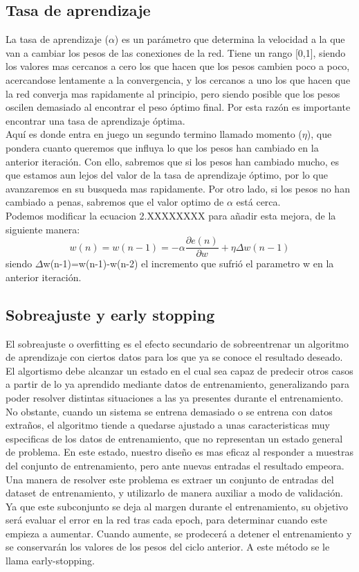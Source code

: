 \subsection{Tasa de aprendizaje}
La tasa de aprendizaje (${\alpha}$) es un parámetro que determina la velocidad a la que van a cambiar los pesos de las conexiones de la red. Tiene un rango [0,1], siendo los valores mas cercanos a cero los que hacen que los pesos cambien poco a poco, acercandose lentamente a la convergencia, y los cercanos a uno los que hacen que la red converja mas rapidamente al principio, pero siendo posible que los pesos oscilen demasiado al encontrar el peso óptimo final. Por esta razón es importante encontrar una tasa de aprendizaje óptima.\\
Aquí es donde entra en juego un segundo termino llamado momento (${\eta}$), que pondera cuanto queremos que influya lo que los pesos han cambiado en la anterior iteración. Con ello, sabremos que si los pesos han cambiado mucho, es que estamos aun lejos del valor de la tasa de aprendizaje óptimo, por lo que avanzaremos en su busqueda mas rapidamente. Por otro lado, si los pesos no han cambiado a penas, sabremos que el valor optimo de ${\alpha}$ está cerca.\\
Podemos modificar la ecuacion 2.XXXXXXXX para añadir esta mejora, de la siguiente manera:
\begin{equation}
w(n) = w(n-1) = - \alpha \frac{\partial e(n)}{\partial w} + \eta \Delta w(n-1)
\end{equation}
siendo ${\Delta}$w(n-1)=w(n-1)-w(n-2) el incremento que sufrió el parametro w en la anterior iteración.
\subsection{Sobreajuste y early stopping}
El sobreajuste o overfitting es el efecto secundario de sobreentrenar un algoritmo de aprendizaje con ciertos datos para los que ya se conoce el resultado deseado. El algortismo debe alcanzar un estado en el cual sea capaz de predecir otros casos a partir de lo ya aprendido mediante datos de entrenamiento, generalizando para poder resolver distintas situaciones a las ya presentes durante el entrenamiento. No obstante, cuando un sistema se entrena demasiado o se entrena con datos extraños, el algoritmo tiende a quedarse ajustado a unas caracteristicas muy especificas de los datos de entrenamiento, que no representan un estado general de problema. En este estado, nuestro diseño es mas eficaz al responder a muestras del conjunto de entrenamiento, pero ante nuevas entradas el resultado empeora.\\
Una manera de resolver este problema es extraer un conjunto de entradas del dataset de entrenamiento, y utilizarlo de manera auxiliar a modo de validación. Ya que este subconjunto se deja al margen durante el entrenamiento, su objetivo será evaluar el error en la red tras cada epoch, para determinar cuando este empieza a aumentar. Cuando aumente, se prodecerá a detener el entrenamiento y se conservarán los valores de los pesos del ciclo anterior. A este método se le llama early-stopping.

